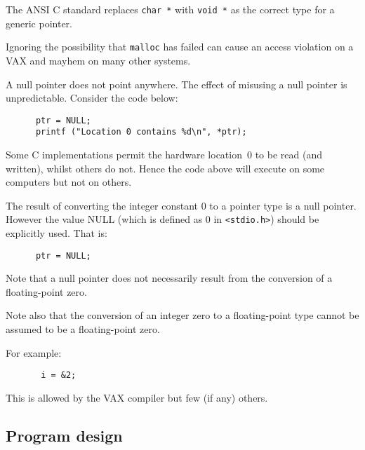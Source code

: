 
The ANSI C standard replaces {\tt char~*} with {\tt void~*} as the 
correct type for a generic pointer.



Ignoring the possibility that {\tt malloc} has failed 
can cause an access violation 
on a  VAX and mayhem on many other systems.


A null pointer does not point anywhere. The effect of misusing a
null pointer is unpredictable. 
Consider the code below:
\begin{verbatim}
      ptr = NULL;
      printf ("Location 0 contains %d\n", *ptr);
\end{verbatim}
Some C implementations permit the 
hardware location~0 to be read (and written), whilst others do not.
Hence the code above will execute on some computers but not on others.


The result of converting the integer constant 0 to a pointer type is a 
null pointer. However the value NULL (which is defined as 0 in  
\verb!<stdio.h>!) should be explicitly used. That is:  
\begin{verbatim}
      ptr = NULL;
\end{verbatim}
Note that a null pointer does not necessarily
result from the conversion of a floating-point zero. 

Note also that the conversion of an integer zero to a floating-point type 
cannot be assumed to be a floating-point zero.




For example:
\begin{verbatim}
       i = &2;
\end{verbatim} 
This is allowed by the VAX  compiler but few (if any) others.

 
\newpage
\subsection{Program design}


